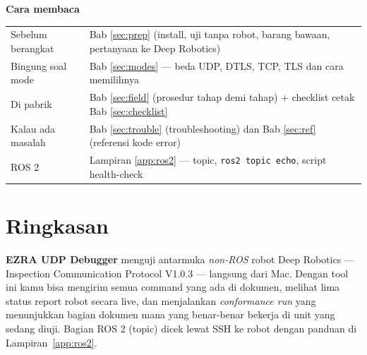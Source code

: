 \documentclass[11pt,a4paper]{article}
\newcommand{\code}[1]{\texttt{#1}}
\begin{document}
\begin{titlepage}
\begin{minipage}{170mm}
\vspace{10pt}
{\large\bfseries Cara membaca}\par\vspace{2pt}

\begin{tabularx}{\linewidth}{@{}L{38mm}Y@{}}
Sebelum berangkat & Bab \ref{sec:prep} (install, uji tanpa robot, barang bawaan, pertanyaan ke Deep Robotics)\\
Bingung soal mode & Bab \ref{sec:modes} --- beda UDP, DTLS, TCP, TLS dan cara memilihnya\\
Di pabrik & Bab \ref{sec:field} (prosedur tahap demi tahap) + checklist cetak Bab \ref{sec:checklist}\\
Kalau ada masalah & Bab \ref{sec:trouble} (troubleshooting) dan Bab \ref{sec:ref} (referensi kode error)\\
ROS 2 & Lampiran \ref{app:ros2} --- topic, \code{ros2 topic echo}, script health-check\\
\end{tabularx}
\end{minipage}
\restoregeometry
\end{titlepage}

\tableofcontents
\clearpage

\section{Ringkasan}\label{sec:summary}

\textbf{EZRA UDP Debugger} menguji antarmuka \emph{non-ROS} robot Deep Robotics --- Inspection Communication
Protocol V1.0.3 --- langsung dari Mac. Dengan tool ini kamu bisa mengirim semua command yang ada di dokumen,
melihat lima status report robot secara live, dan menjalankan \emph{conformance run} yang menunjukkan bagian
dokumen mana yang benar-benar bekerja di unit yang sedang diuji. Bagian ROS 2 (topic) dicek lewat SSH ke robot
dengan panduan di Lampiran~\ref{app:ros2}.
\end{document}
